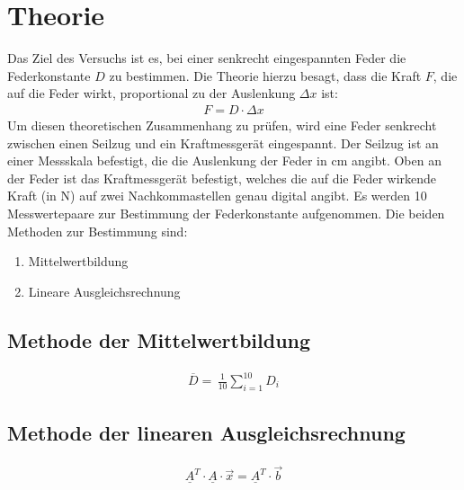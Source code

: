 \section{Theorie}
\label{sec:Theorie}
Das Ziel des Versuchs ist es, bei einer senkrecht eingespannten Feder die Federkonstante $D$ zu bestimmen. Die Theorie	hierzu besagt, dass die Kraft $F$, die auf die Feder wirkt, proportional zu der Auslenkung $\Delta x$ ist:
\begin{equation}
    \begin{aligned}
    F = D \cdot \Delta x
\end{aligned}
\end{equation}
Um diesen theoretischen Zusammenhang zu prüfen, wird eine Feder senkrecht zwischen einen Seilzug und ein Kraftmessgerät eingespannt. Der Seilzug ist an einer Messskala befestigt, die die Auslenkung der Feder in $\unit{\cm}$ angibt. Oben an der Feder ist das Kraftmessgerät befestigt, welches die auf die Feder wirkende Kraft (in $\unit{\N}$) auf zwei Nachkommastellen genau digital angibt.
Es werden 10 Messwertepaare zur Bestimmung der Federkonstante aufgenommen. Die beiden Methoden zur Bestimmung sind:
\begin{enumerate}
    \item Mittelwertbildung
    \item Lineare Ausgleichsrechnung
\end{enumerate}
\subsection{Methode der Mittelwertbildung}
\begin{equation}
    \begin{aligned}
    \overline{D} {} = \,\frac{1}{10} \sum_{i=1}^{10} D_i
    \label{eqn:methode1}
\end{aligned}
\end{equation}
\subsection{Methode der linearen Ausgleichsrechnung}
\begin{equation}
\begin{aligned}
      \underline{A}^T \cdot \underline{A} \cdot \vec{x} = \underline{A}^T \cdot \vec{b}
\end{aligned}
\end{equation}

